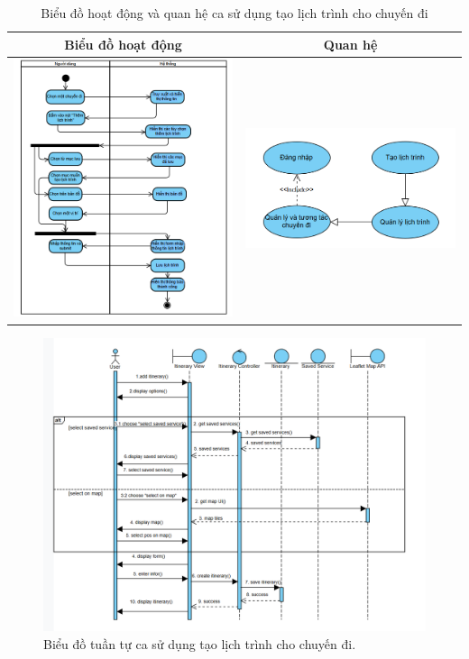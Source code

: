 \begin{table}[H] %
    \centering
    \caption{Biểu đồ hoạt động và quan hệ ca sử dụng tạo lịch trình cho chuyến đi} %
    \label{tab:uc_create_itinerary_item_diagrams} %
    \begin{tabular}{| c | c |}
        \hline
        \textbf{Biểu đồ hoạt động} & \textbf{Quan hệ} \\
        \hline
        \includegraphics[width=0.5\linewidth]{figures/c3/3-3-13-ad.png} %
        &
        \includegraphics[width=0.45\linewidth]{figures/c3/3-3-13-rd.png} \\ %
        \hline
    \end{tabular}
\end{table}

\begin{figure}[H]
    \centering
    \includegraphics[width=1\textwidth]{figures/c3/3-3-13-sd.png} %
    \caption{Biểu đồ tuần tự ca sử dụng tạo lịch trình cho chuyến đi.} %
    \label{fig:3-3-13-sequence-diagram}
\end{figure}